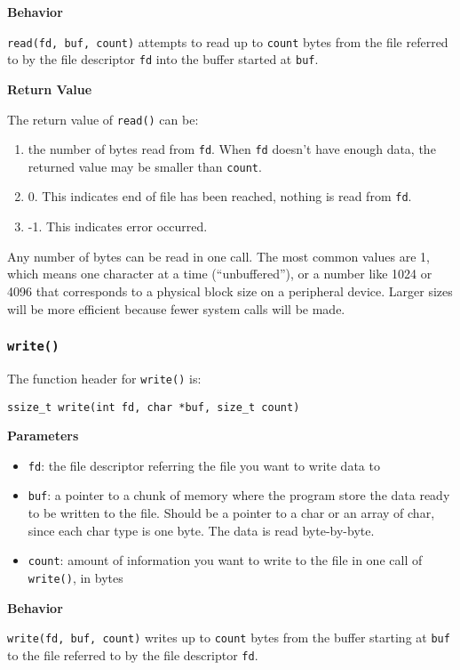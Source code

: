 \documentclass[11pt]{article}
\begin{document}
\textbf{Behavior}

\texttt{read(fd, buf, count)} attempts to read up to \texttt{count} bytes from the file referred to by the file descriptor \texttt{fd} into the buffer started at \texttt{buf}.

\textbf{Return Value}

The return value of \texttt{read()} can be:
\begin{enumerate}
\item the number of bytes read from \texttt{fd}. When \texttt{fd} doesn't have enough data, the returned value may be smaller than \texttt{count}.
\item 0. This indicates end of file has been reached, nothing is read from \texttt{fd}.
\item -1. This indicates error occurred.
\end{enumerate}

Any number of bytes can be read in one call. The most common values are 1, which means one character at a time (``unbuffered''), or a number like 1024 or 4096 that corresponds to a physical block size on a peripheral device. Larger sizes will be more efficient because fewer system calls will be made.
\subsubsection{\texttt{write()}}
\label{sec:orga43da80}
The function header for \texttt{write()} is:
\begin{verbatim}
ssize_t write(int fd, char *buf, size_t count)
\end{verbatim}

\textbf{Parameters}

\begin{itemize}
\item \texttt{fd}: the file descriptor referring the file you want to write data to
\item \texttt{buf}: a pointer to a chunk of memory where the program store the data ready to be written to the file. Should be a pointer to a char or an array of char, since each char type is one byte. The data is read byte-by-byte.
\item \texttt{count}: amount of information you want to write to the file in one call of \texttt{write()}, in bytes
\end{itemize}

\textbf{Behavior}

\texttt{write(fd, buf, count)} writes up to \texttt{count} bytes from the buffer starting at \texttt{buf} to the file referred to by the file descriptor \texttt{fd}.
\end{document}
